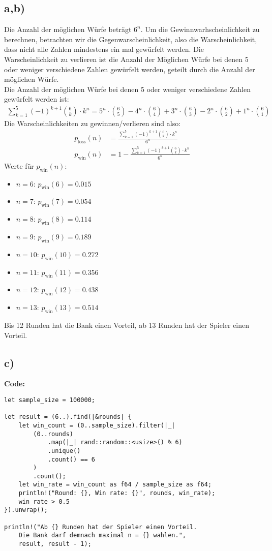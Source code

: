 \documentclass[a4paper]{scrartcl}
\begin{document}
\subsection*{a,b)}
Die Anzahl der möglichen Würfe beträgt $6^n$. 
Um die Gewinnwarhscheinlichkeit zu berechnen, betrachten wir die Gegenwarscheinlichkeit, also die Warscheinlichkeit, dass nicht alle Zahlen mindestens ein mal gewürfelt werden.
Die Warscheinlichkeit zu verlieren ist die Anzahl der Möglichen Würfe bei denen 5 oder weniger verschiedene Zahlen gewürfelt werden, geteilt durch die Anzahl der möglichen Würfe. \\
Die Anzahl der möglichen Würfe bei denen 5 oder weniger verschiedene Zahlen gewürfelt werden ist:
\begin{align*}
    \sum_{k=1}^{5} (-1)^{k+1} \binom{6}{k} \cdot k^n = 5^n \cdot \binom{6}{5} - 4^n \cdot \binom{6}{4} + 3^n \cdot \binom{6}{3} - 2^n \cdot \binom{6}{2} + 1^n \cdot \binom{6}{1} 
\end{align*}
Die Warscheinlichkeiten zu gewinnen/verlieren sind also:
\begin{align*}
    p_{\text{loss}}(n) &= \frac{\sum_{k=1}^{5} (-1)^{k+1} \binom{6}{k} \cdot k^n}{6^n} \\
    p_{\text{win}}(n) &= 1 - \frac{\sum_{k=1}^{5} (-1)^{k+1} \binom{6}{k} \cdot k^n}{6^n}
\end{align*}
Werte für $p_{\text{win}}(n)$:
\begin{itemize}
    \item $n = 6$: $p_{\text{win}}(6) = 0.015$
    \item $n = 7$: $p_{\text{win}}(7) = 0.054$
    \item $n = 8$: $p_{\text{win}}(8) = 0.114$
    \item $n = 9$: $p_{\text{win}}(9) = 0.189$
    \item $n = 10$: $p_{\text{win}}(10) = 0.272$
    \item $n = 11$: $p_{\text{win}}(11) = 0.356$
    \item $n = 12$: $p_{\text{win}}(12) = 0.438$
    \item $n = 13$: $p_{\text{win}}(13) = 0.514$
\end{itemize}
Bis 12 Runden hat die Bank einen Vorteil, ab 13 Runden hat der Spieler einen Vorteil.

\subsection*{c)}
\textbf{Code:}
\begin{lstlisting}
let sample_size = 100000;

let result = (6..).find(|&rounds| {
    let win_count = (0..sample_size).filter(|_| 
        (0..rounds)
            .map(|_| rand::random::<usize>() % 6)
            .unique()
            .count() == 6
        )
        .count();
    let win_rate = win_count as f64 / sample_size as f64;
    println!("Round: {}, Win rate: {}", rounds, win_rate);
    win_rate > 0.5
}).unwrap();

println!("Ab {} Runden hat der Spieler einen Vorteil. 
    Die Bank darf demnach maximal n = {} wahlen.", 
    result, result - 1);
\end{lstlisting}
\end{document}
